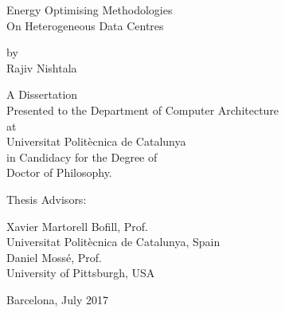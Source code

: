 \thispagestyle{empty}

\begin{center}

{\LARGE Energy Optimising Methodologies \\
    \vspace{0.5em}
    On Heterogeneous Data Centres}

\vspace{1.0cm}

\begin{large}
    {\large by}\\
{\large Rajiv Nishtala}\\
\vspace{.5cm}
\end{large}

\vspace{2.0cm}

{\large A Dissertation \\
    Presented to the Department of Computer Architecture \\
    at \\
    Universitat Polit\`ecnica de Catalunya\\
    in Candidacy for the Degree of \\
    Doctor of Philosophy.}
\end{center}

\vspace{2.2cm}%

{\large Thesis Advisors:}%

\vspace{1.0cm}%

{\hspace{0em} \large Xavier Martorell Bofill, Prof.}\\
{\hspace*{1.4em} \large Universitat Polit\`ecnica de Catalunya, Spain}\\


\vspace*{1.0cm}%
{\hspace{0cm} \large Daniel Moss\'e, Prof.}\\
{\hspace*{1.4em} \large University of Pittsburgh, USA}%
\vspace*{2.0cm}

\begin{center}
{\large Barcelona, July 2017}
\end{center}
